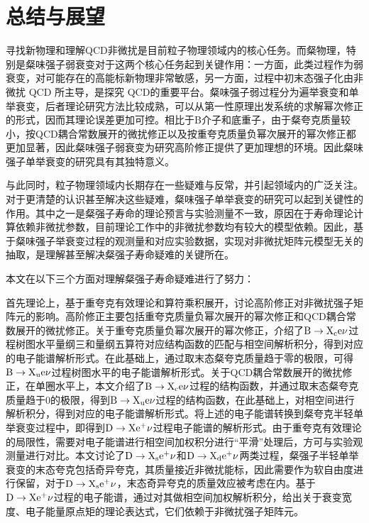 \chapter{总结与展望}
寻找新物理和理解QCD非微扰是目前粒子物理领域内的核心任务。而粲物理，特别是粲味强子弱衰变对于这两个核心任务起到关键作用：一方面，此类过程作为弱衰变，对可能存在的高能标新物理非常敏感，另一方面，过程中初末态强子化由非微扰 QCD 所主导，是探究 QCD的重要平台。粲味强子弱过程分为遍举衰变和单举衰变，后者理论研究方法比较成熟，可以从第一性原理出发系统的求解幂次修正的形式，因而其理论误差更加可控。相比于B介子和底重子，由于粲夸克质量较小，按QCD耦合常数展开的微扰修正以及按重夸克质量负幂次展开的幂次修正都更加显著，因此粲味强子弱衰变为研究高阶修正提供了更加理想的环境。因此粲味强子单举衰变的研究具有其独特意义。

与此同时，粒子物理领域内长期存在一些疑难与反常，并引起领域内的广泛关注。对于更清楚的认识甚至解决这些疑难，粲味强子单举衰变的研究可以起到关键性的作用。其中之一是粲强子寿命的理论预言与实验测量不一致，原因在于寿命理论计算依赖非微扰参数，目前理论工作中的非微扰参数均有较大的模型依赖。因此，基于粲味强子举衰变过程的观测量和对应实验数据，实现对非微扰矩阵元模型无关的抽取，是理解甚至解决粲强子寿命疑难的关键所在。

本文在以下三个方面对理解粲强子寿命疑难进行了努力：

首先理论上，基于重夸克有效理论和算符乘积展开，讨论高阶修正对非微扰强子矩阵元的影响。高阶修正主要包括重夸克质量负幂次展开的幂次修正和QCD耦合常数展开的微扰修正。关于重夸克质量负幂次展开的幂次修正，介绍了$\mathrm{B\to X_{c}e\nu}$过程树图水平量纲三和量纲五算符对应结构函数的匹配与相空间解析积分，得到对应的电子能谱解析形式。在此基础上，通过取末态粲夸克质量趋于零的极限，可得$\mathrm{B\to X_{u}e\nu}$过程树图水平的电子能谱解析形式。关于QCD耦合常数展开的微扰修正，在单圈水平上，本文介绍了$\mathrm{B\to X_{c}e\nu}$过程的结构函数，并通过取末态粲夸克质量趋于0的极限，得到$\mathrm{B\to X_{u}e\nu}$过程的结构函数，在此基础上，对相空间进行解析积分，得到对应的电子能谱解析形式。将上述的电子能谱转换到粲夸克半轻单举衰变过程中，即得到$\mathrm{D\to X e^{+}\nu}$过程电子能谱的解析形式。由于重夸克有效理论的局限性，需要对电子能谱进行相空间加权积分进行“平滑”处理后，方可与实验观测量进行对比。本文讨论了$\mathrm{D\to X_s e^{+}\nu}$和$\mathrm{D\to X_d e^{+}\nu}$两类过程，粲强子半轻单举衰变的末态夸克包括奇异夸克，其质量接近非微扰能标，因此需要作为软自由度进行保留，对于$\mathrm{D\to X_s e^{+}\nu}$，末态奇异夸克的质量效应被考虑在内。基于$\mathrm{D\to X e^{+}\nu}$过程的电子能谱，通过对其做相空间加权解析积分，给出关于衰变宽度、电子能量原点矩的理论表达式，它们依赖于非微扰强子矩阵元。

